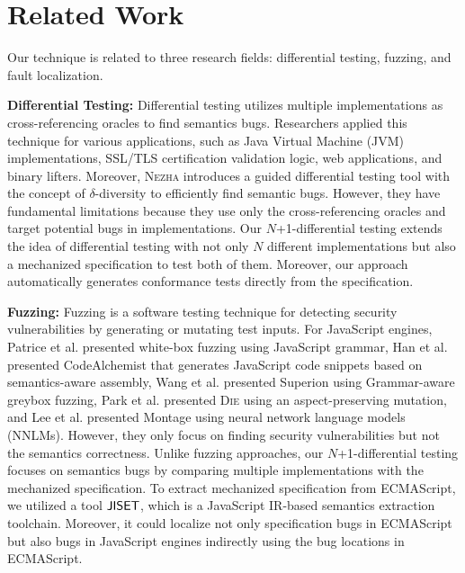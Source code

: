 \section{Related Work}\label{sec:related}

Our technique is related to three research fields: differential testing,
fuzzing, and fault localization.

\textbf{Differential Testing:} Differential testing\cite{diff-test} utilizes
multiple implementations as cross-referencing oracles to find semantics bugs.
Researchers applied this technique for various applications, such as Java
Virtual Machine (JVM) implementations\cite{diff-jvm}, SSL/TLS certification
validation logic\cite{nezha,diff-ssl,diff-ssl2}, web
applications\cite{diff-web}, and binary lifters\cite{ir-diff-test}.  Moreover,
\textsc{Nezha}\cite{nezha} introduces a guided differential testing tool with
the concept of $\delta$-diversity to efficiently find semantic bugs.  However,
they have fundamental limitations because they use only the cross-referencing
oracles and target potential bugs in implementations.  Our $N$+1-differential
testing extends the idea of differential testing with not only $N$ different
implementations but also a mechanized specification to test both of them.
Moreover, our approach automatically generates conformance tests directly from
the specification.

\textbf{Fuzzing:} Fuzzing is a software testing technique for detecting
security vulnerabilities by generating\cite{imf,gen-fuzzing,csmith} or
mutating\cite{mutate-fuzzing,mutate-fuzzing2,mutate-fuzzing3} test inputs.  For
JavaScript\cite{js-hopl} engines, Patrice et al.\cite{grammar-whitebox}
presented white-box fuzzing using JavaScript grammar, Han et
al.\cite{codealchemist} presented CodeAlchemist that generates JavaScript code
snippets based on semantics-aware assembly, Wang et al.\cite{superion}
presented Superion using Grammar-aware greybox fuzzing, Park et al.\cite{die}
presented \textsc{Die} using an aspect-preserving mutation, and Lee et
al.\cite{montage} presented Montage using neural network language models
(NNLMs).  However, they only focus on finding security vulnerabilities but not
the semantics correctness. Unlike fuzzing approaches, our $N$+1-differential
testing focuses on semantics bugs by comparing multiple implementations with
the mechanized specification.  To extract mechanized specification from
ECMAScript, we utilized a tool $\text{\sf JISET}$, which is a JavaScript IR-based
semantics extraction toolchain.  Moreover, it could localize not only
specification bugs in ECMAScript but also bugs in JavaScript engines indirectly
using the bug locations in ECMAScript.

